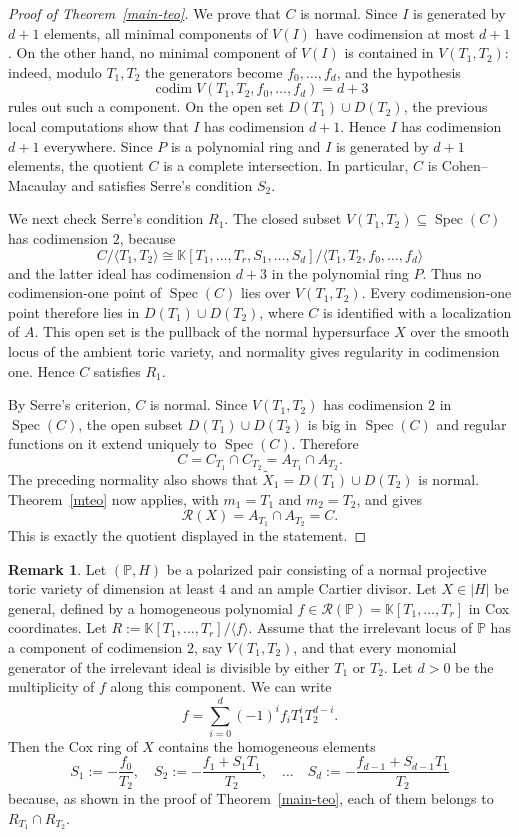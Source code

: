 \documentclass{amsart}
\theoremstyle{definition}
\newtheorem{remark}[theorem]{Remark}
\theoremstyle{remark}
\begin{document}
\begin{proof}[Proof of Theorem~\ref{main-teo}]
We prove that $C$ is normal. Since $I$ is generated by $d+1$ elements, all minimal components of $V(I)$ have codimension at most $d+1$. On the other hand, no minimal component of $V(I)$ is contained in $V(T_1,T_2)$: indeed, modulo $T_1,T_2$ the generators become $f_0,\dots,f_d$, and the hypothesis
\[
\operatorname{codim} V(T_1,T_2,f_0,\dots,f_d)=d+3
\]
rules out such a component. On the open set $D(T_1)\cup D(T_2)$, the previous local computations show that $I$ has codimension $d+1$. Hence $I$ has codimension $d+1$ everywhere. Since $P$ is a polynomial ring and $I$ is generated by $d+1$ elements, the quotient $C$ is a complete intersection. In particular, $C$ is Cohen--Macaulay and satisfies Serre's condition $S_2$.

We next check Serre's condition $R_1$. The closed subset $V(T_1,T_2)\subseteq \operatorname{Spec}(C)$ has codimension $2$, because
\[
C/\langle T_1,T_2\rangle
\cong
\mathbb K[T_1,\dots,T_r,S_1,\dots,S_d]/
\langle T_1,T_2,f_0,\dots,f_d\rangle
\]
and the latter ideal has codimension $d+3$ in the polynomial ring $P$.
Thus no codimension-one point of $\operatorname{Spec}(C)$ lies over $V(T_1,T_2)$. Every codimension-one point therefore lies in $D(T_1)\cup D(T_2)$, where $C$ is identified with a localization of $A$. This open set is the pullback of the normal hypersurface $X$ over the smooth locus of the ambient toric variety, and normality gives regularity in codimension one. Hence $C$ satisfies $R_1$.

By Serre's criterion, $C$ is normal. Since $V(T_1,T_2)$ has codimension $2$ in $\operatorname{Spec}(C)$, the open subset $D(T_1)\cup D(T_2)$ is big in $\operatorname{Spec}(C)$ and regular functions on it extend uniquely to $\operatorname{Spec}(C)$. Therefore
\[
C=C_{T_1}\cap C_{T_2}=A_{T_1}\cap A_{T_2}.
\]
The preceding normality also shows that $\tilde X_1=D(T_1)\cup D(T_2)$ is normal. Theorem~\ref{mteo} now applies, with $m_1=T_1$ and $m_2=T_2$, and gives
\[
\mathcal R(X)=A_{T_1}\cap A_{T_2}=C.
\]
This is exactly the quotient displayed in the statement.
\end{proof}

\begin{remark}
\label{main-rem}
Let $(\mathbb{P},H)$ be a polarized pair consisting of a
normal projective toric variety of dimension at least $4$
and an ample Cartier divisor.
Let $X\in |H|$ be general, defined by a homogeneous polynomial $f \in \mathcal{R}(\mathbb{P}) = \mathbb{K}[T_1, \dots, T_r]$ in Cox coordinates.
Let $R := \mathbb{K}[T_1, \dots, T_r]/\langle f\rangle$.
Assume that the irrelevant locus of $\mathbb P$ has a component of codimension $2$, say $V(T_1,T_2)$, and that every monomial generator of the irrelevant ideal is divisible by either $T_1$ or $T_2$.
Let $d>0$ be the multiplicity of $f$ along this component. We can write
\[
 f = \sum_{i=0}^d(-1)^if_iT_1^iT_2^{d-i}.
\]
Then the Cox ring of $X$ contains the homogeneous elements
\[
 S_1 := -\frac{f_0}{T_2},
 \quad
 S_2 := -\frac{f_1+S_1T_1}{T_2},
 \quad
 \dots
 \quad
 S_d := -\frac{f_{d-1}+S_{d-1}T_1}{T_2}
\]
because, as shown in the proof of Theorem~\ref{main-teo}, each of them belongs to $R_{T_1}\cap R_{T_2}$.
\end{remark}
\end{document}
